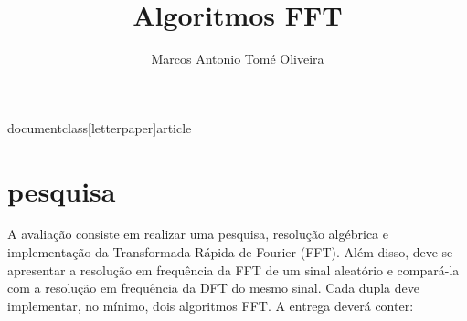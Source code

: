 documentclass[letterpaper]{article}
\usepackage[legalpaper, left=1 cm, right=1cm, top=0.5cm, bottom=0.5cm] {geometry}
\date{} %
\usepackage{xcolor}
\usepackage{listings}
\usepackage{graphicx}
\usepackage{hyperref} %
\usepackage[utf8]{inputenc}
\usepackage[T1]{fontenc}
\usepackage[brazil]{babel}
\usepackage{amsmath}





\title{Algoritmos FFT}
\author{Marcos Antonio Tomé Oliveira}


\maketitle
\tableofcontents
\listoffigures
\newpage

\section{pesquisa}



A avaliação consiste em realizar uma pesquisa, resolução algébrica e implementação da Transformada Rápida de Fourier (FFT). Além disso, deve-se apresentar a resolução em frequência da FFT de um sinal aleatório e compará-la com a resolução em frequência da DFT do mesmo sinal. Cada dupla deve implementar, no mínimo, dois algoritmos FFT. A entrega deverá conter:

